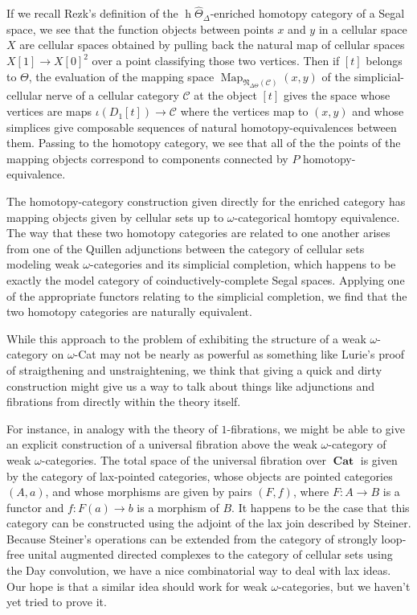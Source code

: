 \documentclass[a4paper,9pt]{amsart}
\theoremstyle{plain}   %
\theoremstyle{remark}
\theoremstyle{plain}
\DeclareMathOperator{\Cat}{\mathbf{Cat}}
\newcommand{\cellset}{\ensuremath{\widehat{\Theta}}}
\DeclareMathOperator{\Map}{Map}
\begin{document}
If we recall Rezk's definition of the \(\operatorname{h}\cellset_\Delta\)-enriched homotopy category of a Segal space, we see that the function objects between points \(x\) and \(y\) in a cellular space \(X\) are cellular spaces obtained by pulling back the natural map of cellular spaces \(X[1]\to X[0]^2\) over a point classifying those two vertices.  Then if \([t]\) belongs to \(\Theta\), the evaluation of the mapping space \(\Map_{\mathfrak{N}_{\Delta\Theta}(\mathcal{C})}(x,y)\) of the simplicial-cellular nerve of a cellular category \(\mathcal{C}\) at the object \([t]\) gives the space whose vertices are maps \(\iota(D_1[t]) \to \mathcal{C}\) where the vertices map to \((x,y)\) and whose simplices give composable sequences of natural homotopy-equivalences between them. Passing to the homotopy category, we see that all of the the points of the mapping objects correspond to components connected by \(P\) homotopy-equivalence.  

The homotopy-category construction given directly for the enriched category has mapping objects given by cellular sets up to \(\omega\)-categorical homtopy equivalence.  The way that these two homotopy categories are related to one another arises from one of the Quillen adjunctions between the category of cellular sets modeling weak \(\omega\)-categories and its simplicial completion, which happens to be exactly the model category of coinductively-complete Segal spaces.  Applying one of the appropriate functors relating to the simplicial completion, we find that the two homotopy categories are naturally equivalent.  

While this approach to the problem of exhibiting the structure of a weak \(\omega\)-category on \(\omega\)-Cat may not be nearly as powerful as something like Lurie's proof of straigthening and unstraightening, we think that giving a quick and dirty construction might give us a way to talk about things like adjunctions and fibrations from directly within the theory itself.  

For instance, in analogy with the theory of \(1\)-fibrations, we might be able to give an explicit construction of a universal fibration above the weak \(\omega\)-category of weak \(\omega\)-categories.  The total space of the universal fibration over \(\Cat\) is given by the category of lax-pointed categories, whose objects are pointed categories \((A,a)\), and whose morphisms are given by pairs \((F,f)\), where \(F:A\to B\) is a functor and \(f:F(a)\to b\) is a morphism of \(B\).  It happens to be the case that this category can be constructed using the adjoint of the lax join described by Steiner.  Because Steiner's operations can be extended from the category of strongly loop-free unital augmented directed complexes to the category of cellular sets using the Day convolution, we have a nice combinatorial way to deal with lax ideas.   Our hope is that a similar idea should work for weak \(\omega\)-categories, but we haven't yet tried to prove it.
\end{document}
